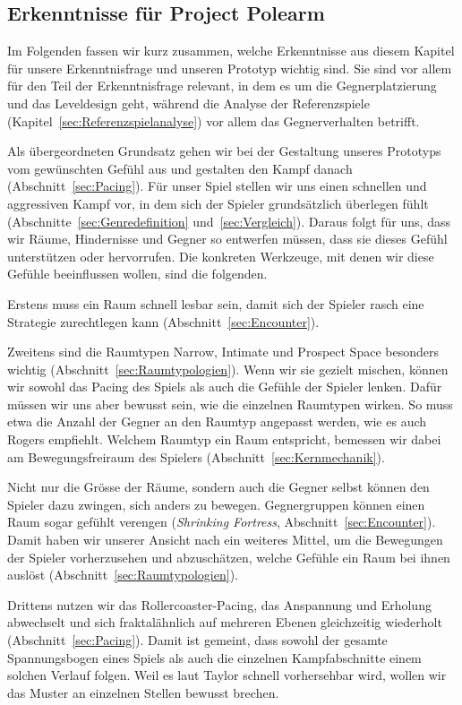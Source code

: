 \documentclass[../Main.tex]{subfiles}
\begin{document}
\subsection{Erkenntnisse für Project Polearm} \label{sec:ZwischenfazitLD}

Im Folgenden fassen wir kurz zusammen, welche Erkenntnisse aus diesem Kapitel für unsere Erkenntnisfrage und unseren Prototyp wichtig sind. Sie sind vor allem für den Teil der Erkenntnisfrage relevant, in dem es um die Gegnerplatzierung und das Leveldesign geht, während die Analyse der Referenzspiele (Kapitel~\ref{sec:Referenzspielanalyse}) vor allem das Gegnerverhalten betrifft.

Als übergeordneten Grundsatz gehen wir bei der Gestaltung unseres Prototyps vom gewünschten Gefühl aus und gestalten den Kampf danach (Abschnitt~\ref{sec:Pacing}). Für unser Spiel stellen wir uns einen schnellen und aggressiven Kampf vor, in dem sich der Spieler grundsätzlich überlegen fühlt (Abschnitte~\ref{sec:Genredefinition} und~\ref{sec:Vergleich}). Daraus folgt für uns, dass wir Räume, Hindernisse und Gegner so entwerfen müssen, dass sie dieses Gefühl unterstützen oder hervorrufen. Die konkreten Werkzeuge, mit denen wir diese Gefühle beeinflussen wollen, sind die folgenden.

Erstens muss ein Raum schnell lesbar sein, damit sich der Spieler rasch eine Strategie zurechtlegen kann (Abschnitt~\ref{sec:Encounter}).

Zweitens sind die Raumtypen Narrow, Intimate und Prospect Space besonders wichtig (Abschnitt~\ref{sec:Raumtypologien}). Wenn wir sie gezielt mischen, können wir sowohl das Pacing des Spiels als auch die Gefühle der Spieler lenken. Dafür müssen wir uns aber bewusst sein, wie die einzelnen Raumtypen wirken. So muss etwa die Anzahl der Gegner an den Raumtyp angepasst werden, wie es auch Rogers empfiehlt.\autocite[245]{rogers2014levelup} Welchem Raumtyp ein Raum entspricht, bemessen wir dabei am Bewegungsfreiraum des Spielers (Abschnitt~\ref{sec:Kernmechanik}).

Nicht nur die Grösse der Räume, sondern auch die Gegner selbst können den Spieler dazu zwingen, sich anders zu bewegen. Gegnergruppen können einen Raum sogar gefühlt verengen (\textit{Shrinking Fortress}, Abschnitt~\ref{sec:Encounter}). Damit haben wir unserer Ansicht nach ein weiteres Mittel, um die Bewegungen der Spieler vorherzusehen und abzuschätzen, welche Gefühle ein Raum bei ihnen auslöst (Abschnitt~\ref{sec:Raumtypologien}).

Drittens nutzen wir das Rollercoaster-Pacing, das Anspannung und Erholung abwechselt und sich fraktalähnlich auf mehreren Ebenen gleichzeitig wiederholt (Abschnitt~\ref{sec:Pacing}). Damit ist gemeint, dass sowohl der gesamte Spannungsbogen eines Spiels als auch die einzelnen Kampfabschnitte einem solchen Verlauf folgen. Weil es laut Taylor schnell vorhersehbar wird, wollen wir das Muster an einzelnen Stellen bewusst brechen.
\end{document}
